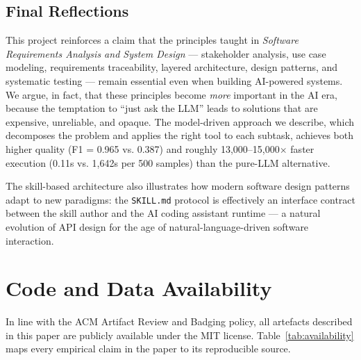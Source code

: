 \documentclass[acmlarge,nonacm,screen]{acmart}
\begin{document}
\subsection{Final Reflections}

This project reinforces a claim that the principles taught in \textit{Software Requirements Analysis and System Design} --- stakeholder analysis, use case modeling, requirements traceability, layered architecture, design patterns, and systematic testing --- remain essential even when building AI-powered systems. We argue, in fact, that these principles become \textit{more} important in the AI era, because the temptation to ``just ask the LLM'' leads to solutions that are expensive, unreliable, and opaque. The model-driven approach we describe, which decomposes the problem and applies the right tool to each subtask, achieves both higher quality (F1 = 0.965 vs. 0.387) and roughly 13{,}000--15{,}000$\times$ faster execution (0.11s vs. 1,642s per 500 samples) than the pure-LLM alternative.

The skill-based architecture also illustrates how modern software design patterns adapt to new paradigms: the \texttt{SKILL.md} protocol is effectively an interface contract between the skill author and the AI coding assistant runtime --- a natural evolution of API design for the age of natural-language-driven software interaction.

\section{Code and Data Availability}
\label{sec:availability}

In line with the ACM Artifact Review and Badging policy, all
artefacts described in this paper are publicly available under the
MIT license. Table~\ref{tab:availability} maps every empirical claim
in the paper to its reproducible source.
\end{document}
